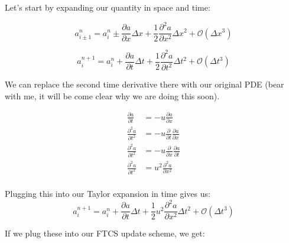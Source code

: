 \documentclass{article}
\theoremstyle{demo}
\begin{document}
Let's start by expanding our quantity in space and time:

\begin{equation}
    a_{i\pm 1}^n = a_i^n \pm \frac{\partial a}{\partial x}\Delta x +
    \frac{1}{2}\frac{\partial^2 a}{\partial x^2}\Delta x^2 + \mathcal{O}{(\Delta x^3)}
\end{equation}

\begin{equation}
    a_{i}^{n+1} = a_i^n + \frac{\partial a}{\partial t}\Delta t +
    \frac{1}{2}\frac{\partial^2 a}{\partial t^2}\Delta t^2 + \mathcal{O}{(\Delta t^3)}
\end{equation}

We can replace the second time derivative there with our original PDE (bear with
me, it will be come clear why we are doing this soon).

\begin{equation}
    \begin{aligned}
        \frac{\partial a}{\partial t} &= -u\frac{\partial a}{\partial x} \\
        \frac{\partial^2 a}{\partial t^2} &= -u\frac{\partial}{\partial t}\frac{\partial a}{\partial x} \\
        \frac{\partial^2 a}{\partial t^2} &= -u\frac{\partial}{\partial x}\frac{\partial a}{\partial t} \\
        \frac{\partial^2 a}{\partial t^2} &= u^2\frac{\partial^2 a}{\partial x^2} \\
    \end{aligned}
\end{equation}

Plugging this into our Taylor expansion in time gives us:
\begin{equation}
    a_{i}^{n+1} = a_i^n + \frac{\partial a}{\partial t}\Delta t +
    \frac{1}{2}u^2\frac{\partial^2 a}{\partial x^2}\Delta t^2 + \mathcal{O}{(\Delta t^3)}
\end{equation}

If we plug these into our FTCS update scheme, we get:
\end{document}
